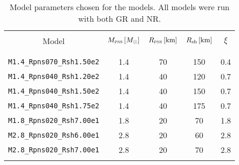 \begin{table}[b]
  \scriptsize
  \renewcommand{\tabcolsep}{0.09cm}
  \centering
  \begin{tabularx}{0.46\textwidth}{ccccc} \\
    \toprule \\
    Model &
    $M_{\textsc{pns}}\left[M_{\odot}\right]$ &
    $R_{\textsc{pns}}\left[\mathrm{km}\right]$ &
    $R_{\mathrm{sh}}\left[\mathrm{km}\right]$ &
    $\xi$ \\ \\
    \midrule \\
    \texttt{M1.4\_Rpns070\_Rsh1.50e2} & 1.4 & 70 & 150 & 0.4 \\
    \texttt{M1.4\_Rpns040\_Rsh1.20e2} & 1.4 & 40 & 120 & 0.7 \\
    \texttt{M1.4\_Rpns040\_Rsh1.50e2} & 1.4 & 40 & 150 & 0.7 \\
    \texttt{M1.4\_Rpns040\_Rsh1.75e2} & 1.4 & 40 & 175 & 0.7 \\
    \texttt{M1.8\_Rpns020\_Rsh7.00e1} & 1.8 & 20 &  70 & 1.8 \\
    \texttt{M2.8\_Rpns020\_Rsh6.00e1} & 2.8 & 20 &  60 & 2.8 \\
    \texttt{M2.8\_Rpns020\_Rsh7.00e1} & 2.8 & 20 &  70 & 2.8 \\
    \bottomrule \\
  \end{tabularx}
  \caption{Model parameters chosen for the \nModels{} models.
  All models were run with both GR and NR.
  }
  \label{tab.modelParameters}
\end{table}

